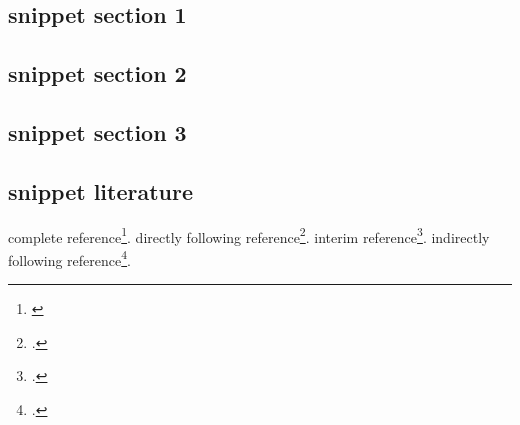 %
%
%



\subsection{snippet section 1}
\subsection{snippet section 2}
\subsection{snippet section 3}

\subsection{snippet literature}

complete reference\footnote{\cite[cf.][1]{Allen2001a}}.
directly following reference\footcite[cf.][2]{Allen2001a}.
interim reference\footcite[cf.][3]{ModLanAss2009a}.
indirectly following reference\footcite[cf.][4]{Allen2001a}.

%

